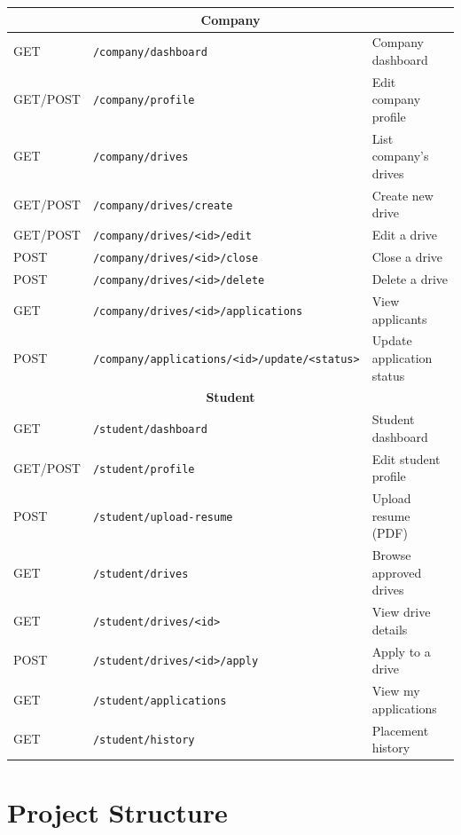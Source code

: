 \documentclass[12pt,a4paper]{article}
\begin{document}
\begin{longtable}{|l|l|p{5.5cm}|}
\multicolumn{3}{|c|}{\textbf{Company}} \\ \hline
GET      & \texttt{/company/dashboard}  & Company dashboard             \\ \hline
GET/POST & \texttt{/company/profile}    & Edit company profile          \\ \hline
GET      & \texttt{/company/drives}     & List company's drives         \\ \hline
GET/POST & \texttt{/company/drives/create}       & Create new drive     \\ \hline
GET/POST & \texttt{/company/drives/<id>/edit}    & Edit a drive         \\ \hline
POST     & \texttt{/company/drives/<id>/close}   & Close a drive        \\ \hline
POST     & \texttt{/company/drives/<id>/delete}  & Delete a drive       \\ \hline
GET      & \texttt{/company/drives/<id>/applications} & View applicants \\ \hline
POST     & \texttt{/company/applications/<id>/update/<status>} & Update application status \\ \hline

\multicolumn{3}{|c|}{\textbf{Student}} \\ \hline
GET      & \texttt{/student/dashboard}  & Student dashboard             \\ \hline
GET/POST & \texttt{/student/profile}    & Edit student profile          \\ \hline
POST     & \texttt{/student/upload-resume}       & Upload resume (PDF)  \\ \hline
GET      & \texttt{/student/drives}     & Browse approved drives        \\ \hline
GET      & \texttt{/student/drives/<id>}         & View drive details   \\ \hline
POST     & \texttt{/student/drives/<id>/apply}   & Apply to a drive     \\ \hline
GET      & \texttt{/student/applications}        & View my applications \\ \hline
GET      & \texttt{/student/history}    & Placement history             \\ \hline

\end{longtable}

\section{Project Structure}
\end{document}
